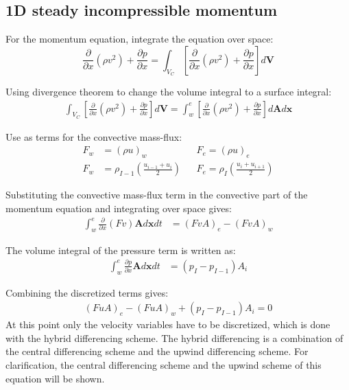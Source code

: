 \subsection{1D steady incompressible momentum}
For the momentum equation, integrate the equation over space:
\begin{equation}
\frac{\partial}{\partial x} (\rho v^2) + \frac{\partial p}{\partial x}  =\int_{V_C} \left[ \frac{\partial}{\partial x} (\rho v^2) + \frac{\partial p}{\partial x} \right]d\boldsymbol{V}
\end{equation}

Using divergence theorem to change the volume integral to a surface integral:
\begin{align}
	\int_{V_C} \left[\frac{\partial}{\partial x} (\rho v^2) + \frac{\partial p}{\partial x} \right]d\boldsymbol{V} = \int_{w}^{e} \left[\frac{\partial}{\partial x} (\rho v^2) + \frac{\partial p}{\partial x} \right]d\boldsymbol{A}d\boldsymbol{x}
\end{align}


Use as terms for the convective mass-flux:
\begin{align}
	F_w &= (\rho u)_w 	&&F_e = (\rho u)_e \nonumber \\
	F_w &= \rho_{I-1} \left(\frac{u_{i-1}+u_{i}}{2}\right) 	&&F_e = \rho_{I} \left(\frac{u_{i}+u_{i+1}}{2}\right) 
\end{align}


Substituting the convective mass-flux term in the convective part of the momentum equation and integrating over space gives:
\begin{align}
	\int_{w}^{e}  \frac{\partial }{\partial x} (F v) \boldsymbol{A} d\boldsymbol{x} dt &= 	(FvA)_e-(FvA)_w 
\end{align}

The volume integral of the pressure term is written as:
\begin{align}
	\int_{w}^{e} \frac{\partial p}{\partial x}  \boldsymbol{A}d\boldsymbol{x}dt &= 	 (p_I - p_{I-1})A_i
\end{align}

Combining the discretized terms gives:
\begin{align}
	(FuA)_e-(FuA)_w + (p_I - p_{I-1})A_i  = 0 
\end{align}
At this point only the velocity variables have to be discretized, which is done with the hybrid differencing scheme. The hybrid differencing is a combination of the central differencing scheme and the upwind differencing scheme. For clarification, the central differencing scheme and the upwind scheme of this equation will be shown.



